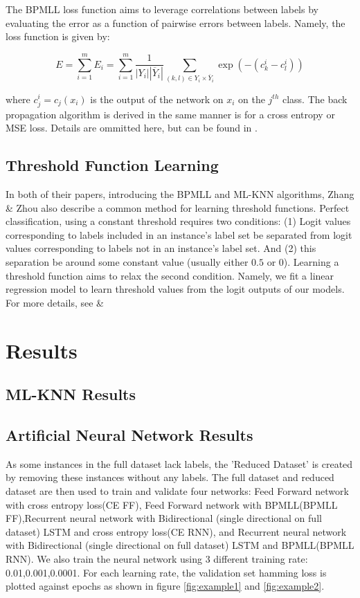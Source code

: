 \documentclass[11pt]{article}
\begin{document}
The BPMLL loss function aims to leverage correlations between labels by evaluating the error as a function of pairwise errors between labels. Namely, the loss function is given by:

$$
    E = \sum_{i = 1}^m E_i = \sum_{i = 1}^m \frac{1}{|Y_i| |\overline{Y}_i|} \sum_{(k,l) \in Y_i \times \overline{Y}_i} \exp(-(c_k^i - c_l^i))
$$

where $c_j^i = c_j(x_i)$ is the output of the network on $x_i$ on the $j^{th}$ class. The back propagation algorithm is derived in the same manner is for a cross entropy or MSE loss. Details are ommitted here, but can be found in \autocite{bpmll}.
  
\subsection{Threshold Function Learning}

In both of their papers, introducing the BPMLL and ML-KNN algorithms, Zhang \& Zhou also describe a common method for learning threshold functions. Perfect classification, using a constant threshold requires two conditions: (1) Logit values corresponding to labels included in an instance's label set  be separated from logit values corresponding to labels not in an instance's label set. And (2) this separation be around some constant value (usually either $0.5$ or $0$). Learning a threshold function aims to relax the second condition. Namely, we fit a linear regression model to learn threshold values from the logit outputs of our models. For more details, see \autocite{bpmll} \& \autocite{mlknn} 
\section{Results}

\subsection{ML-KNN Results}

\subsection{Artificial Neural Network Results}

As some instances in the full dataset lack labels,  the 'Reduced Dataset' is created by removing these instances without any labels. The full dataset and reduced dataset are then used to train and validate four networks: Feed Forward network with cross entropy loss(CE FF), Feed Forward network with BPMLL(BPMLL FF),Recurrent neural network with Bidirectional (single directional on full dataset) LSTM and  cross entropy loss(CE RNN), and Recurrent neural network with Bidirectional (single directional on full dataset) LSTM and BPMLL(BPMLL RNN). We also train the neural network using 3 different training rate: 0.01,0.001,0.0001. For each learning rate, the validation set hamming loss is plotted against epochs as shown in figure \ref{fig:example1} and \ref{fig:example2}.
\end{document}
